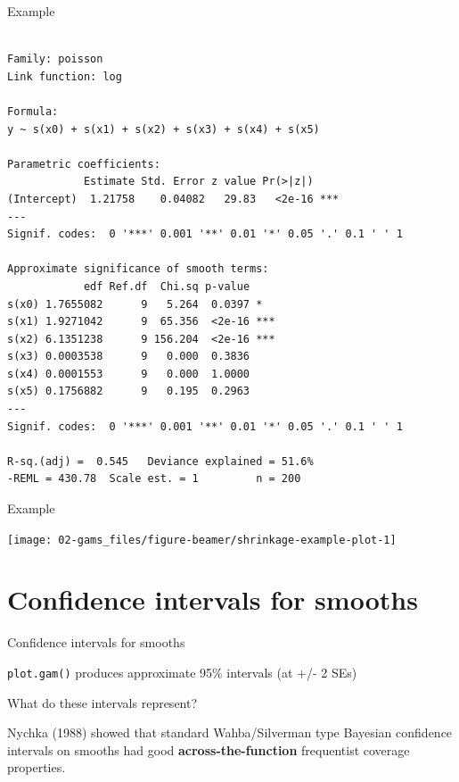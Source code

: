 \documentclass[10pt,ignorenonframetext,compress, aspectratio=169]{beamer}
\begin{document}
\begin{frame}[fragile]{Example}

\begin{verbatim}

Family: poisson 
Link function: log 

Formula:
y ~ s(x0) + s(x1) + s(x2) + s(x3) + s(x4) + s(x5)

Parametric coefficients:
            Estimate Std. Error z value Pr(>|z|)    
(Intercept)  1.21758    0.04082   29.83   <2e-16 ***
---
Signif. codes:  0 '***' 0.001 '**' 0.01 '*' 0.05 '.' 0.1 ' ' 1

Approximate significance of smooth terms:
            edf Ref.df  Chi.sq p-value    
s(x0) 1.7655082      9   5.264  0.0397 *  
s(x1) 1.9271042      9  65.356  <2e-16 ***
s(x2) 6.1351238      9 156.204  <2e-16 ***
s(x3) 0.0003538      9   0.000  0.3836    
s(x4) 0.0001553      9   0.000  1.0000    
s(x5) 0.1756882      9   0.195  0.2963    
---
Signif. codes:  0 '***' 0.001 '**' 0.01 '*' 0.05 '.' 0.1 ' ' 1

R-sq.(adj) =  0.545   Deviance explained = 51.6%
-REML = 430.78  Scale est. = 1         n = 200
\end{verbatim}

\end{frame}

\begin{frame}{Example}

\begin{center}\texttt{[image: 02-gams\_files/figure-beamer/shrinkage-example-plot-1]} \end{center}

\end{frame}

\section{Confidence intervals for
smooths}\label{confidence-intervals-for-smooths}

\begin{frame}[fragile]{Confidence intervals for smooths}

\texttt{plot.gam()} produces approximate 95\% intervals (at +/- 2 SEs)

What do these intervals represent?

Nychka (1988) showed that standard Wahba/Silverman type Bayesian
confidence intervals on smooths had good \textbf{across-the-function}
frequentist coverage properties.

\end{frame}
\end{document}
